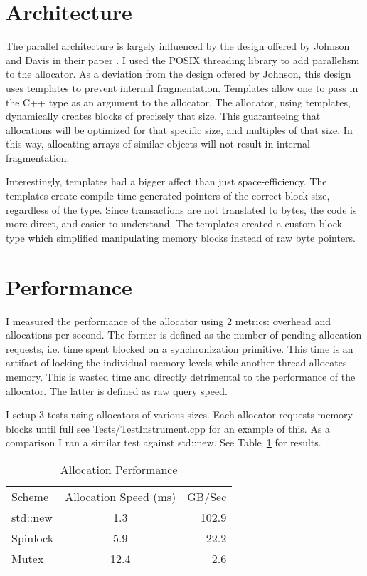 \documentclass[12pt]{article}
\begin{document}
\section{Architecture}
The parallel architecture is largely influenced by the design offered by Johnson
and Davis in their paper \cite{johnson}. I used the POSIX threading library to
add parallelism to the allocator.  As a deviation from the design offered by
Johnson, this design uses templates to prevent internal fragmentation. Templates allow one
to pass in the C++ type as an argument to the allocator.  The
allocator, using templates, dynamically creates blocks of precisely that size.
This guaranteeing that allocations will be optimized for that specific size, and
multiples of that size.  In this way, allocating arrays of similar objects will
not result in internal fragmentation.

Interestingly, templates had a bigger affect than just space-efficiency.  The
templates create compile time generated pointers of the correct block size,
regardless of the type.  Since transactions are not translated to bytes, the
code is more direct, and easier to understand. The templates
created a custom block type which simplified manipulating memory blocks instead
of raw byte pointers.

\section{Performance}
I measured the performance of the allocator using 2 metrics: overhead and
allocations per second.  The former is defined as the number of pending
allocation requests, i.e. time spent blocked on a synchronization primitive.
This time is an artifact of locking the individual memory levels while
another thread allocates memory.  This is wasted time and directly detrimental 
to the performance of the
allocator.  The latter is defined as raw query speed.

I setup 3 tests using allocators of various sizes.  Each allocator requests
memory blocks until full see Tests/TestInstrument.cpp for an example of this.
As a comparison I ran a similar test against std::new. See
Table~\ref{tab:perf} for results.
\begin{table}[h!]
    \centering
    \begin{tabular}{l c r}
        Scheme & Allocation Speed (ms) & GB/Sec\\
        std::new & 1.3 & 102.9\\
        Spinlock & 5.9 & 22.2\\
        Mutex & 12.4 & 2.6\\
    \end{tabular}
    \caption{Allocation Performance}
    \label{tab:perf}
\end{table}
\end{document}
